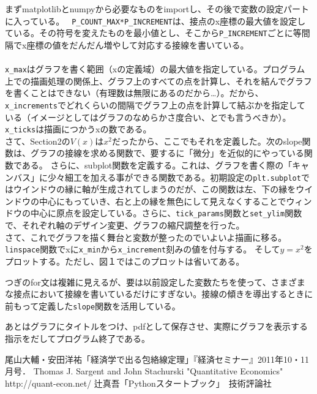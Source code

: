 \documentclass[11pt,a4j,fleqn]{jarticle}
\begin{document}
まずmatplotlibとnumpyから必要なものをimportし、その後で変数の設定パートに入っている。
\verb! P_COUNT_MAX*P_INCREMENT!は、接点のx座標の最大値を設定している。その符号を変えたものを最小値とし、そこから\verb!P_INCREMENT!ごとに等間隔でx座標の値をだんだん増やして対応する接線を書いている。\\
\\\verb!x_max!はグラフを書く範囲（xの定義域）の最大値を指定している。プログラム上での描画処理の関係上、グラフ上のすべての点を計算し、それを結んでグラフを書くことはできない（有理数は無限にあるのだから…）。だから、\verb!x_increments!でどれくらいの間隔でグラフ上の点を計算して結ぶかを指定している（イメージとしてはグラフのなめらかさ度合い、とでも言うべきか）。\verb!x_ticks!は描画につかうxの数である。\\

さて、Section2の$V(x)$は$x^2$だったから、ここでもそれを定義した。次のslope関数は、グラフの接線を求める関数で、要するに「微分」を近似的にやっている関数である。
さらに、subplot関数を定義する。これは、グラフを書く際の「キャンバス」に少々細工を加える事ができる関数である。初期設定の\verb!plt.subplot!ではウインドウの縁に軸が生成されてしまうのだが、この関数は左、下の縁をウインドウの中心にもっていき、右と上の縁を無色にして見えなくすることでウィンドウの中心に原点を設定している。さらに、\verb!tick_params!関数と\verb!set_ylim!関数で、それぞれ軸のデザイン変更、グラフの縮尺調整を行った。\\

さて、これでグラフを描く舞台と変数が整ったのでいよいよ描画に移る。\verb!linspace!関数でxに\verb!x_min!から\verb!x_increment!刻みの値を付与する。
そして$y=x^2$をプロットする。ただし、図１ではこのプロットは省いてある。

つぎのfor文は複雑に見えるが、要は以前設定した変数たちを使って、さまざまな接点において接線を書いているだけにすぎない。接線の傾きを導出するときに前もって定義した\verb!slope!関数を活用している。

あとはグラフにタイトルをつけ、pdfとして保存させ、実際にグラフを表示する指示をだしてプログラム終了である。
\begin{thebibliography}{0}
尾山大輔・安田洋祐「経済学で出る包絡線定理」『経済セミナー』2011年10・11月号．
Thomas J. Sargent and John Stachurski "Quantitative Economics" http://quant-econ.net/
辻真吾「Pythonスタートブック」　技術評論社
\end{thebibliography}
\end{document}
